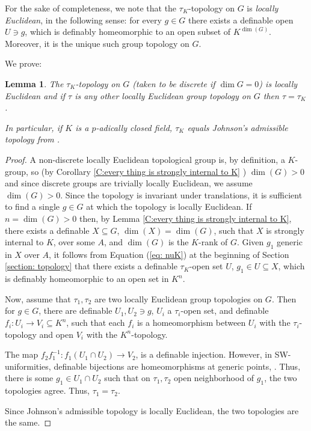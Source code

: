 \documentclass[11pt]{amsart}
\newtheorem{lemma}[theorem]{Lemma}
\theoremstyle{definition}
\newcommand{\0}{\emptyset}
\def\sub{\subseteq}
\begin{document}
For the sake of completeness, we  note that the $\tau_K$-topology on $G$ is {\em locally Euclidean}, in the following sense: for every $g\in G$ there exists a definable open $U\ni g$,  which is definably homeomorphic to an open subset of $K^{\dim(G)}$. Moreover, it is the unique such  group topology on $G$. 

We prove:
\begin{lemma} The $\tau_K$-topology on $G$ (taken to be discrete if $\dim G=0$) is locally Euclidean and if $\tau$ is any other locally Euclidean group topology on $G$ then $\tau=\tau_K$.

In particular, if $K$ is a $p$-adically closed field, $\tau_K$ equals Johnson's admissible topology from \cite{JohnTopQp}.
\end{lemma}
\begin{proof} A non-discrete locally Euclidean topological group is, by definition, a $K$-group, so (by Corollary \ref{C:every thing is strongly internal to K} )  $\dim(G)>0$ and since discrete  groups are trivially locally Euclidean,  we assume $\dim(G)>0$.  Since the topology is invariant under translations, it is sufficient to find a single $g\in G$ at which the topology is locally Euclidean.  If $ n=\dim(G)>0$ then, by Lemma \ref{C:every thing is strongly internal to K}, there exists a definable $X\sub G$, $\dim(X)=\dim(G)$, such that $X$ is strongly internal to $K$, over some $A$, and $\dim(G)$ is the $K$-rank of $G$. Given $g_1$ generic in $X$ over $A$, it follows from Equation (\ref{eq: nuK})  at the beginning of Section \ref{section: topology}  that there exists a definable $\tau_K$-open set $U$, $g_1\in U\sub X$, which is definably homeomorphic to an open set in $K^n$.

Now, assume that $\tau_1,\tau_2$ are  two locally Euclidean group topologies on $G$. Then for $g\in G$, there are definable $U_1,U_2\ni g$, $U_i$ a  $\tau_i$-open set, and definable $f_i:U_i\to V_i\sub   K^n$, such that each $f_i$ is a homeomorphism between $U_i$ with the  $\tau_i$-topology and open $V_i$ with the  $K^n$-topology.

The map $f_2f_1^{-1}:f_1(U_1\cap U_2)\to V_2$, is a definable injection. However, in SW-uniformities, definable bijections are homeomorphisms at generic points, \cite[Corollary 3.8]{SimWal}. Thus,  there is some $g_1\in U_1\cap U_2$ such that on $\tau_1, \tau_2$ open neighborhood of $g_1$, the two topologies agree. Thus, $\tau_1=\tau_2$.

Since Johnson's admissible topology is locally Euclidean, the two topologies are the same.
\end{proof}
\end{document}
